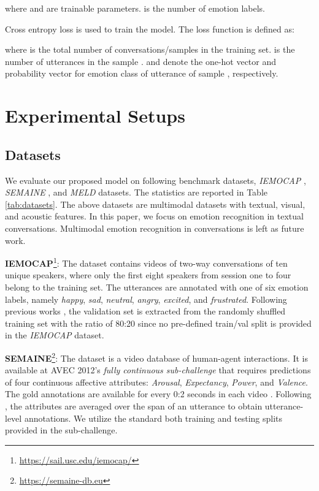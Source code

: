\documentclass[11pt,a4paper]{article}
\begin{document}
where  and  are trainable parameters.
 is the number of emotion labels.

Cross entropy loss is used to train the model. The loss function is defined as:
    
where  is the total number of conversations/samples in the training set.
 is the number of utterances in the sample . 
 and  denote the one-hot vector and probability vector for emotion class  of utterance  of sample , respectively.



\section{Experimental Setups}


\subsection{Datasets}
We evaluate our proposed model on following benchmark datasets, {\it IEMOCAP} \cite{DBLP:journals/lre/BussoBLKMKCLN08}, {\it SEMAINE} \cite{DBLP:journals/taffco/McKeownVCPS12}, and {\it MELD} \cite{DBLP:conf/acl/PoriaHMNCM19} datasets. 
The statistics are reported in Table \ref{tab:datasets}.
The above datasets are multimodal datasets with textual, visual, and acoustic features. In this paper, we focus on emotion recognition in textual conversations. Multimodal emotion recognition in conversations is left as future work. 



\textbf{IEMOCAP}\footnote{\url{https://sail.usc.edu/iemocap/}}: The dataset \cite{DBLP:journals/lre/BussoBLKMKCLN08} contains videos of two-way conversations of ten unique speakers, where only the first eight speakers from session one to four belong to the training set. The utterances are annotated with one of six emotion labels, namely {\it happy}, {\it sad}, {\it neutral}, {\it angry}, {\it excited}, and {\it frustrated}.  
    Following previous works \cite{DBLP:conf/emnlp/HazarikaPMCZ18,DBLP:conf/emnlp/GhosalMPCG19,DBLP:conf/aaai/JiaoLK20}, 
    the validation set is extracted from the randomly shuffled training set with the ratio of 80:20 since no pre-defined train/val split is provided in the {\it IEMOCAP} dataset. 

\textbf{SEMAINE}\footnote{\url{https://semaine-db.eu}}: 
The dataset \cite{DBLP:journals/taffco/McKeownVCPS12} is a video database of human-agent interactions. 
    It is available at AVEC 2012's {\it fully continuous sub-challenge} \cite{DBLP:conf/icmi/SchullerVCP12} that requires predictions of four continuous affective attributes: {\it Arousal}, {\it Expectancy}, {\it Power}, and
    {\it Valence}.
    The gold annotations are available for every 0:2 seconds in each video \cite{DBLP:conf/icmi/NicolleRBPC12}. Following \cite{DBLP:conf/emnlp/HazarikaPMCZ18,DBLP:conf/emnlp/GhosalMPCG19}, the attributes are averaged over the span of an utterance to obtain utterance-level annotations.
    We utilize the standard both training and testing splits provided in the sub-challenge. 
\end{document}
